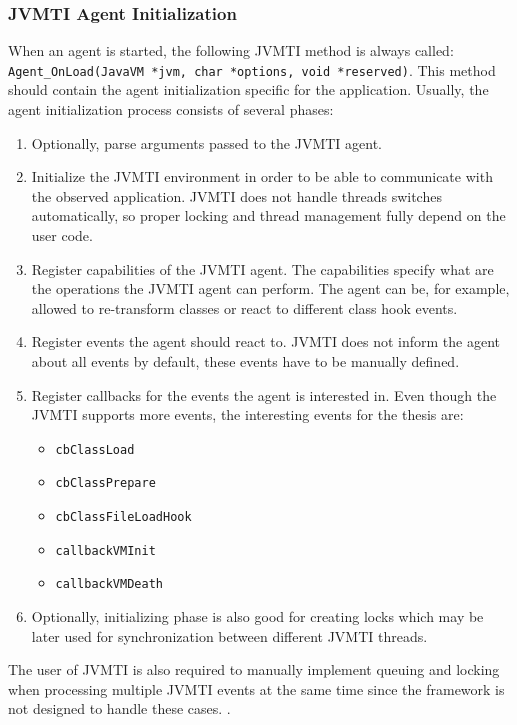 \subsubsection{JVMTI Agent Initialization}
\label{subsec:jvmti_init}
When an agent is started, the following JVMTI method is always called: \linebreak \texttt{Agent\_OnLoad(JavaVM *jvm, char *options, void *reserved)}.  \linebreak This method should contain the agent initialization specific for the application. Usually, the agent initialization process consists of several phases:
\begin{enumerate}
	\item Optionally, parse arguments passed to the JVMTI agent.
	\item Initialize the JVMTI environment in order to be able to communicate with the observed application. JVMTI does not handle threads switches automatically, so proper locking and thread management fully depend on the user code.
	\item Register capabilities of the JVMTI agent. The capabilities specify what are the operations the JVMTI agent can perform. The agent can be, for example, allowed to re-transform classes or react to different class hook events.
	\item Register events the agent should react to. JVMTI does not inform the agent about all events by default, these events have to be manually defined.
	\item Register callbacks for the events the agent is interested in. Even though the JVMTI supports more events, the interesting events for the thesis are: 
		\begin{itemize}
			\item \texttt{cbClassLoad}
			\item \texttt{cbClassPrepare}
			\item \texttt{cbClassFileLoadHook}
			\item \texttt{callbackVMInit}
			\item \texttt{callbackVMDeath}
		\end{itemize}
	\item Optionally, initializing phase is also good for creating locks which may be later used for synchronization between different JVMTI threads.
\end{enumerate}

The user of JVMTI is also required to manually implement queuing and locking when processing multiple JVMTI events at the same time since the framework is not designed to handle these cases. \cite{JVMTI_Callbacks}.
